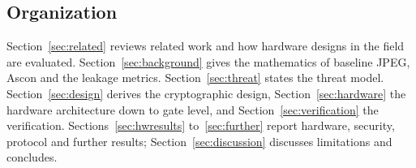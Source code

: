 \subsection{Organization}
Section~\ref{sec:related} reviews related work and how hardware designs in the field are evaluated. Section~\ref{sec:background} gives the mathematics of baseline JPEG, Ascon and the leakage metrics. Section~\ref{sec:threat} states the threat model. Section~\ref{sec:design} derives the cryptographic design, Section~\ref{sec:hardware} the hardware architecture down to gate level, and Section~\ref{sec:verification} the verification. Sections~\ref{sec:hwresults} to~\ref{sec:further} report hardware, security, protocol and further results; Section~\ref{sec:discussion} discusses limitations and concludes.
